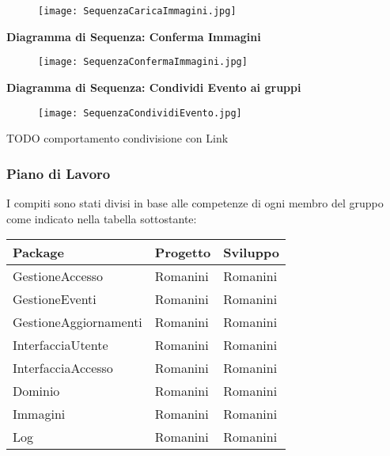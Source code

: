 \begin{figure}[h!]
    \begin{center}
        \texttt{[image: SequenzaCaricaImmagini.jpg]}
    \end{center}
\end{figure}
\hfill \break

\textbf{Diagramma di Sequenza: Conferma Immagini}

\begin{figure}[h!]
    \begin{center}
        \texttt{[image: SequenzaConfermaImmagini.jpg]}
    \end{center}
\end{figure}
\hfill \break
\clearpage
\textbf{Diagramma di Sequenza: Condividi Evento ai gruppi}

\begin{figure}[h!]
    \begin{center}
        \texttt{[image: SequenzaCondividiEvento.jpg]}
    \end{center}
\end{figure}
\hfill \break

\newpage
TODO
comportamento condivisione con Link
\newpage

\subsubsection{Piano di Lavoro}

I compiti sono stati divisi in base alle competenze di
ogni membro del gruppo come indicato nella tabella sottostante:
\hfill \break

\begin{tabular} {|P{5cm}|P{5cm}|P{5cm}|} %
    \hline
    \textbf{Package}      & \textbf{Progetto} & \textbf{Sviluppo} \\
    \hline
    GestioneAccesso       & Romanini          & Romanini          \\
    \hline
    GestioneEventi        & Romanini          & Romanini          \\
    \hline
    GestioneAggiornamenti & Romanini          & Romanini          \\
    \hline
    InterfacciaUtente     & Romanini          & Romanini          \\
    \hline
    InterfacciaAccesso    & Romanini          & Romanini          \\
    \hline
    Dominio               & Romanini          & Romanini          \\
    \hline
    Immagini              & Romanini          & Romanini          \\
    \hline
    Log                   & Romanini          & Romanini          \\
    \hline
\end{tabular}
\hfill \break

